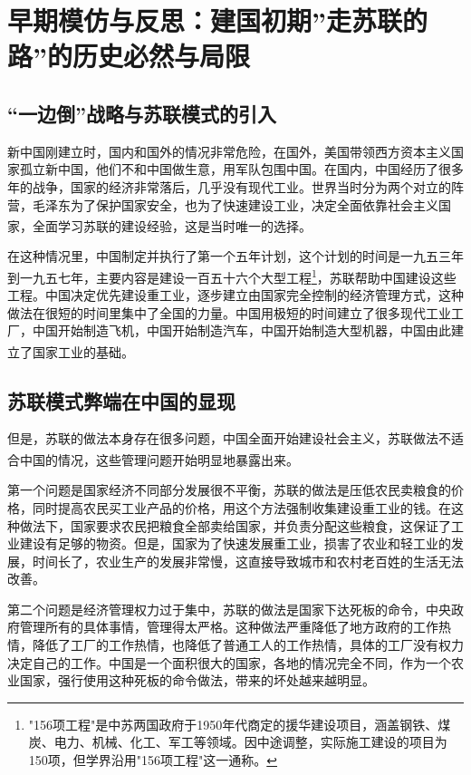 \documentclass[12pt, a4paper]{ctexart}
\newcommand{\upcite}[1]{\textsuperscript{\cite{#1}}}
\numberwithin{table}{section}
\numberwithin{figure}{section}
\begin{document}
\section{早期模仿与反思：建国初期”走苏联的路”的历史必然与局限}
\subsection{“一边倒”战略与苏联模式的引入}
新中国刚建立时，国内和国外的情况非常危险，在国外，美国带领西方资本主义国家孤立新中国，他们不和中国做生意，用军队包围中国。在国内，中国经历了很多年的战争，国家的经济非常落后，几乎没有现代工业。世界当时分为两个对立的阵营，毛泽东为了保护国家安全，也为了快速建设工业，决定全面依靠社会主义国家，全面学习苏联的建设经验，这是当时唯一的选择\upcite{ref3}。

在这种情况里，中国制定并执行了第一个五年计划，这个计划的时间是一九五三年到一九五七年，主要内容是建设一百五十六个大型工程\footnote{"156项工程"是中苏两国政府于1950年代商定的援华建设项目，涵盖钢铁、煤炭、电力、机械、化工、军工等领域。因中途调整，实际施工建设的项目为150项，但学界沿用"156项工程"这一通称。}，苏联帮助中国建设这些工程。中国决定优先建设重工业，逐步建立由国家完全控制的经济管理方式，这种做法在很短的时间里集中了全国的力量。中国用极短的时间建立了很多现代工业工厂，中国开始制造飞机，中国开始制造汽车，中国开始制造大型机器，中国由此建立了国家工业的基础\upcite{ref4}。

\subsection{苏联模式弊端在中国的显现}
但是，苏联的做法本身存在很多问题，中国全面开始建设社会主义，苏联做法不适合中国的情况，这些管理问题开始明显地暴露出来\upcite{ref5}。

第一个问题是国家经济不同部分发展很不平衡，苏联的做法是压低农民卖粮食的价格，同时提高农民买工业产品的价格，用这个方法强制收集建设重工业的钱。在这种做法下，国家要求农民把粮食全部卖给国家，并负责分配这些粮食，这保证了工业建设有足够的物资。但是，国家为了快速发展重工业，损害了农业和轻工业的发展，时间长了，农业生产的发展非常慢，这直接导致城市和农村老百姓的生活无法改善。

第二个问题是经济管理权力过于集中，苏联的做法是国家下达死板的命令，中央政府管理所有的具体事情，管理得太严格。这种做法严重降低了地方政府的工作热情，降低了工厂的工作热情，也降低了普通工人的工作热情，具体的工厂没有权力决定自己的工作。中国是一个面积很大的国家，各地的情况完全不同，作为一个农业国家，强行使用这种死板的命令做法，带来的坏处越来越明显。
\end{document}
